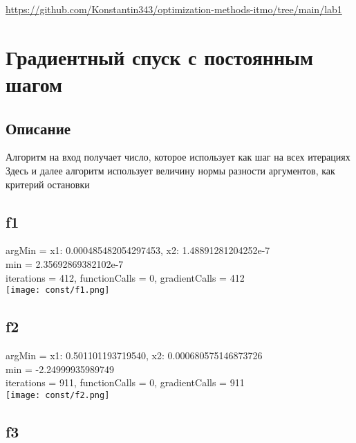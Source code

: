 \documentclass{article}
\title{Лабораторная работа #1}
\author{Крухмалев Константин,Рашо Елизавета,Фролова Дарья, М34371}
\begin{document}
\maketitle


\href{https://github.com/Konstantin343/optimization-methods-itmo/tree/main/lab1}{https://github.com/Konstantin343/optimization-methods-itmo/tree/main/lab1}

\section{Градиентный спуск с постоянным шагом}

\subsection{Описание}
Алгоритм на вход получает число, которое использует как шаг на всех итерациях \\
Здесь и далее алгоритм использует величину нормы разности аргументов, как критерий остановки

\subsection{f1}

argMin = {x1: 0.000485482054297453, x2: 1.48891281204252e-7} \\
min =  2.35692869382102e-7 \\
iterations = 412, functionCalls = 0, gradientCalls = 412 \\

\texttt{[image: const/f1.png]} \\

\subsection{f2}

argMin = {x1: 0.501101193719540, x2: 0.000680575146873726} \\
min =  -2.24999935989749 \\
iterations = 911, functionCalls = 0, gradientCalls = 911 \\

\texttt{[image: const/f2.png]} \\

\subsection{f3}
\end{document}
